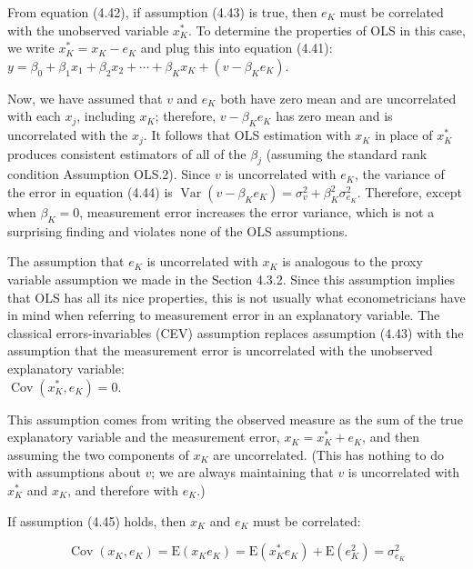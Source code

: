 \documentclass[10pt]{article}
\begin{document}
From equation (4.42), if assumption (4.43) is true, then $e_{K}$ must be correlated with the unobserved variable $x_{K}^{*}$. To determine the properties of OLS in this case, we write $x_{K}^{*}=x_{K}-e_{K}$ and plug this into equation (4.41):\\
$y=\beta_{0}+\beta_{1} x_{1}+\beta_{2} x_{2}+\cdots+\beta_{K} x_{K}+\left(v-\beta_{K} e_{K}\right)$.

Now, we have assumed that $v$ and $e_{K}$ both have zero mean and are uncorrelated with each $x_{j}$, including $x_{K}$; therefore, $v-\beta_{K} e_{K}$ has zero mean and is uncorrelated with the $x_{j}$. It follows that OLS estimation with $x_{K}$ in place of $x_{K}^{*}$ produces consistent estimators of all of the $\beta_{j}$ (assuming the standard rank condition Assumption OLS.2). Since $v$ is uncorrelated with $e_{K}$, the variance of the error in equation (4.44) is $\operatorname{Var}\left(v-\beta_{K} e_{K}\right)=\sigma_{v}^{2}+\beta_{K}^{2} \sigma_{e_{K}}^{2}$. Therefore, except when $\beta_{K}=0$, measurement error increases the error variance, which is not a surprising finding and violates none of the OLS assumptions.

The assumption that $e_{K}$ is uncorrelated with $x_{K}$ is analogous to the proxy variable assumption we made in the Section 4.3.2. Since this assumption implies that OLS has all its nice properties, this is not usually what econometricians have in mind when referring to measurement error in an explanatory variable. The classical errors-invariables (CEV) assumption replaces assumption (4.43) with the assumption that the measurement error is uncorrelated with the unobserved explanatory variable:\\
$\operatorname{Cov}\left(x_{K}^{*}, e_{K}\right)=0$.

This assumption comes from writing the observed measure as the sum of the true explanatory variable and the measurement error, $x_{K}=x_{K}^{*}+e_{K}$, and then assuming the two components of $x_{K}$ are uncorrelated. (This has nothing to do with assumptions about $v$; we are always maintaining that $v$ is uncorrelated with $x_{K}^{*}$ and $x_{K}$, and therefore with $e_{K}$.)

If assumption (4.45) holds, then $x_{K}$ and $e_{K}$ must be correlated:


\begin{equation*}
\operatorname{Cov}\left(x_{K}, e_{K}\right)=\mathrm{E}\left(x_{K} e_{K}\right)=\mathrm{E}\left(x_{K}^{*} e_{K}\right)+\mathrm{E}\left(e_{K}^{2}\right)=\sigma_{e_{K}}^{2} \tag{4.46}
\end{equation*}
\end{document}
